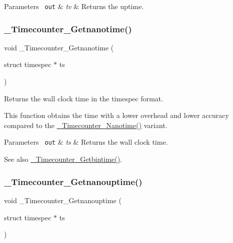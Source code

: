 \begin{DoxyParams}[1]{Parameters}
\mbox{\texttt{ out}}  & {\em tv} & Returns the uptime. \\
\hline
\end{DoxyParams}
\mbox{\label{group__RTEMSScoreTimecounter_gabc2ea691f0d75942be121b9a0afc4429}} 
\subsubsection{\texorpdfstring{\_Timecounter\_Getnanotime()}{\_Timecounter\_Getnanotime()}}
{\footnotesize\ttfamily void \+\_\+\+Timecounter\+\_\+\+Getnanotime (\begin{DoxyParamCaption}\item[{struct timespec $\ast$}]{ts }\end{DoxyParamCaption})}



Returns the wall clock time in the timespec format. 

This function obtains the time with a lower overhead and lower accuracy compared to the \mbox{\hyperlink{group__RTEMSScoreTimecounter_ga27875b3222b3884499771611d7902380}{\+\_\+\+Timecounter\+\_\+\+Nanotime()}} variant.


\begin{DoxyParams}[1]{Parameters}
\mbox{\texttt{ out}}  & {\em ts} & Returns the wall clock time.\\
\hline
\end{DoxyParams}
\begin{DoxySeeAlso}{See also}
\mbox{\hyperlink{group__RTEMSScoreTimecounter_gaad315babe0faa38d8e287b6354e7e1f7}{\+\_\+\+Timecounter\+\_\+\+Getbintime()}}. 
\end{DoxySeeAlso}
\mbox{\label{group__RTEMSScoreTimecounter_gaa05abad208a8fbd882c71cc45c18342b}} 
\subsubsection{\texorpdfstring{\_Timecounter\_Getnanouptime()}{\_Timecounter\_Getnanouptime()}}
{\footnotesize\ttfamily void \+\_\+\+Timecounter\+\_\+\+Getnanouptime (\begin{DoxyParamCaption}\item[{struct timespec $\ast$}]{ts }\end{DoxyParamCaption})}



